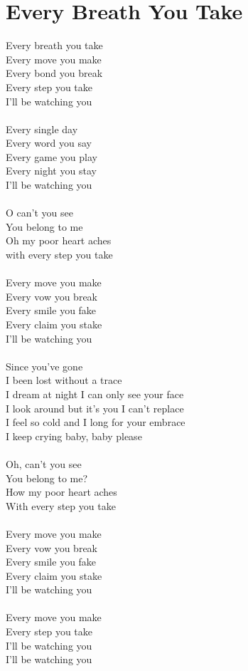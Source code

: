 \section{Every Breath You Take}
\begin{multicols}{2}
Every breath you take\\
Every move you make\\
Every bond you break\\
Every step you take\\
I'll be watching you\\
\\
Every single day\\
Every word you say\\
Every game you play\\
Every night you stay\\
I'll be watching you\\
\\
O can't you see\\
You belong to me\\
Oh my poor heart aches \\
with every step you take\\
\\
Every move you make\\
Every vow you break\\
Every smile you fake\\
Every claim you stake\\
I'll be watching you\\
\\
Since you've gone \\
I been lost without a trace\\
I dream at night I can only see your face\\
I look around but it's you I can't replace\\
I feel so cold and I long for your embrace\\
I keep crying baby, baby please\\
\columnbreak\\
Oh, can't you see\\
You belong to me?\\
How my poor heart aches \\
With every step you take\\
\\
Every move you make\\
Every vow you break\\
Every smile you fake \\
Every claim you stake\\
I'll be watching you\\
\\
Every move you make \\
Every step you take\\
I'll be watching you\\
I'll be watching you
\end{multicols}